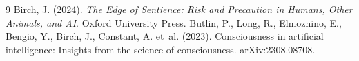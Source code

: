 \documentclass{situationist-preprint}
\begin{document}
\begin{thebibliography}{9}\small
{} Birch, J. (2024). \emph{The Edge of Sentience: Risk and Precaution in Humans, Other Animals, and AI}. Oxford University Press.
 Butlin, P., Long, R., Elmoznino, E., Bengio, Y., Birch, J., Constant, A. et~al. (2023). Consciousness in artificial intelligence: Insights from the science of consciousness. arXiv:2308.08708.
\end{thebibliography}
\end{document}

